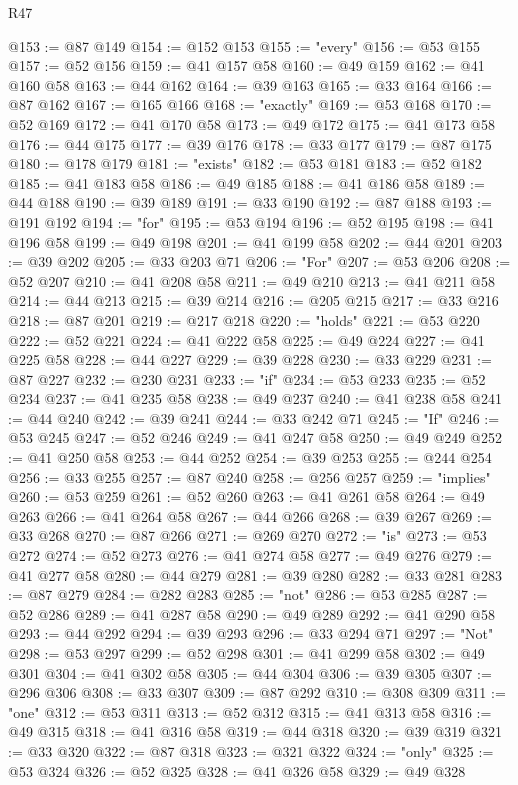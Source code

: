 \begin{lexlean}{R47}
\begin{coremodule}
@153 := @87 @149
@154 := @152 @153
@155 := "every"
@156 := @53 @155
@157 := @52 @156
@159 := @41 @157 @58
@160 := @49 @159
@162 := @41 @160 @58
@163 := @44 @162
@164 := @39 @163
@165 := @33 @164
@166 := @87 @162
@167 := @165 @166
@168 := "exactly"
@169 := @53 @168
@170 := @52 @169
@172 := @41 @170 @58
@173 := @49 @172
@175 := @41 @173 @58
@176 := @44 @175
@177 := @39 @176
@178 := @33 @177
@179 := @87 @175
@180 := @178 @179
@181 := "exists"
@182 := @53 @181
@183 := @52 @182
@185 := @41 @183 @58
@186 := @49 @185
@188 := @41 @186 @58
@189 := @44 @188
@190 := @39 @189
@191 := @33 @190
@192 := @87 @188
@193 := @191 @192
@194 := "for"
@195 := @53 @194
@196 := @52 @195
@198 := @41 @196 @58
@199 := @49 @198
@201 := @41 @199 @58
@202 := @44 @201
@203 := @39 @202
@205 := @33 @203 @71
@206 := "For"
@207 := @53 @206
@208 := @52 @207
@210 := @41 @208 @58
@211 := @49 @210
@213 := @41 @211 @58
@214 := @44 @213
@215 := @39 @214
@216 := @205 @215
@217 := @33 @216
@218 := @87 @201
@219 := @217 @218
@220 := "holds"
@221 := @53 @220
@222 := @52 @221
@224 := @41 @222 @58
@225 := @49 @224
@227 := @41 @225 @58
@228 := @44 @227
@229 := @39 @228
@230 := @33 @229
@231 := @87 @227
@232 := @230 @231
@233 := "if"
@234 := @53 @233
@235 := @52 @234
@237 := @41 @235 @58
@238 := @49 @237
@240 := @41 @238 @58
@241 := @44 @240
@242 := @39 @241
@244 := @33 @242 @71
@245 := "If"
@246 := @53 @245
@247 := @52 @246
@249 := @41 @247 @58
@250 := @49 @249
@252 := @41 @250 @58
@253 := @44 @252
@254 := @39 @253
@255 := @244 @254
@256 := @33 @255
@257 := @87 @240
@258 := @256 @257
@259 := "implies"
@260 := @53 @259
@261 := @52 @260
@263 := @41 @261 @58
@264 := @49 @263
@266 := @41 @264 @58
@267 := @44 @266
@268 := @39 @267
@269 := @33 @268
@270 := @87 @266
@271 := @269 @270
@272 := "is"
@273 := @53 @272
@274 := @52 @273
@276 := @41 @274 @58
@277 := @49 @276
@279 := @41 @277 @58
@280 := @44 @279
@281 := @39 @280
@282 := @33 @281
@283 := @87 @279
@284 := @282 @283
@285 := "not"
@286 := @53 @285
@287 := @52 @286
@289 := @41 @287 @58
@290 := @49 @289
@292 := @41 @290 @58
@293 := @44 @292
@294 := @39 @293
@296 := @33 @294 @71
@297 := "Not"
@298 := @53 @297
@299 := @52 @298
@301 := @41 @299 @58
@302 := @49 @301
@304 := @41 @302 @58
@305 := @44 @304
@306 := @39 @305
@307 := @296 @306
@308 := @33 @307
@309 := @87 @292
@310 := @308 @309
@311 := "one"
@312 := @53 @311
@313 := @52 @312
@315 := @41 @313 @58
@316 := @49 @315
@318 := @41 @316 @58
@319 := @44 @318
@320 := @39 @319
@321 := @33 @320
@322 := @87 @318
@323 := @321 @322
@324 := "only"
@325 := @53 @324
@326 := @52 @325
@328 := @41 @326 @58
@329 := @49 @328

\end{coremodule}
\end{lexlean}
